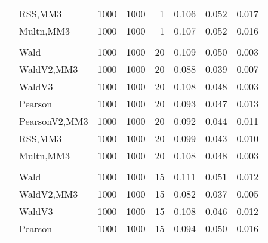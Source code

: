 \documentclass[
]{article}
\begin{document}
\begin{table}[H]
{\begin{tabular}[t]{llrrrrrr}
\hspace{1em} & RSS,MM3 & 1000 & 1000 & 1 & 0.106 & 0.052 & 0.017\\

\hspace{1em} & Multn,MM3 & 1000 & 1000 & 1 & 0.107 & 0.052 & 0.016\\
\cmidrule{1-8}
\addlinespace[0.3em]
\multicolumn{8}{l}{\textbf{1F 15V}}\\
\hspace{1em} & Wald & 1000 & 1000 & 20 & 0.109 & 0.050 & 0.003\\

\hspace{1em} & WaldV2,MM3 & 1000 & 1000 & 20 & 0.088 & 0.039 & 0.007\\

\hspace{1em} & WaldV3 & 1000 & 1000 & 20 & 0.108 & 0.048 & 0.003\\

\hspace{1em} & Pearson & 1000 & 1000 & 20 & 0.093 & 0.047 & 0.013\\

\hspace{1em} & PearsonV2,MM3 & 1000 & 1000 & 20 & 0.092 & 0.044 & 0.011\\

\hspace{1em} & RSS,MM3 & 1000 & 1000 & 20 & 0.099 & 0.043 & 0.010\\

\hspace{1em} & Multn,MM3 & 1000 & 1000 & 20 & 0.108 & 0.048 & 0.003\\
\cmidrule{1-8}
\addlinespace[0.3em]
\multicolumn{8}{l}{\textbf{2F 10V}}\\
\hspace{1em} & Wald & 1000 & 1000 & 15 & 0.111 & 0.051 & 0.012\\

\hspace{1em} & WaldV2,MM3 & 1000 & 1000 & 15 & 0.082 & 0.037 & 0.005\\

\hspace{1em} & WaldV3 & 1000 & 1000 & 15 & 0.108 & 0.046 & 0.012\\

\hspace{1em} & Pearson & 1000 & 1000 & 15 & 0.094 & 0.050 & 0.016\\


\end{tabular}}
\end{table}
\end{document}
